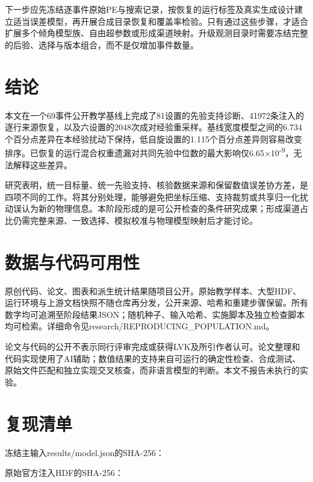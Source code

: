 \documentclass[UTF8,a4paper,11pt,fontset=fandol]{ctexart}
\begin{document}
下一步应先冻结逐事件原始PE与搜索记录，按恢复的运行标签及真实生成设计建立适当误差模型，再开展合成目录恢复和覆盖率检验。只有通过这些步骤，才适合扩展多个倾角模型族、自由超参数或形成渠道映射。升级观测目录时需要冻结完整的后验、选择与版本组合，而不是仅增加事件数量。

\FloatBarrier
\section{结论}\label{sec:10}
本文在一个69事件公开教学基线上完成了81设置的先验支持诊断、41972条注入的逐行来源恢复，以及六设置的2048次成对经验重采样。基线宽度模型之间的6.734个百分点差异在本经验扰动下保持，低自旋设置的1.115个百分点差异则容易改变排序。已恢复的运行混合权重遗漏对共同先验中位数的最大影响仅6.65\(\times\)10\textsuperscript{-9}，无法解释这些差异。

研究表明，统一目标量、统一先验支持、核验数据来源和保留数值误差协方差，是四项不同的工作。将其分别处理，能够避免把坐标压缩、支持裁剪或共享归一化扰动误认为新的物理信息。本阶段形成的是可公开检查的条件研究成果；形成渠道占比仍需完整来源、一致选择、模拟校准与物理模型映射后才能讨论。

\FloatBarrier
\section*{数据与代码可用性}
原创代码、论文、图表和派生统计结果随项目公开。原始教学样本、大型HDF、运行环境与上游文档快照不随仓库再分发，公开来源、哈希和重建步骤保留。所有数字均可追溯至阶段结果JSON；随机种子、输入哈希、实施脚本及独立检查脚本均可检索。详细命令见research/REPRODUCING\_POPULATION.md。

论文与代码的公开不表示同行评审完成或获得LVK及所引作者认可。论文整理和代码实现使用了AI辅助；数值结果的支持来自可运行的确定性检查、合成测试、原始文件匹配和独立实现交叉核查，而非语言模型的判断。本文不报告未执行的实验。

\FloatBarrier
\appendix
\section{复现清单}\label{app:reproduction}
冻结主输入results/model.json的SHA-256：\par\nopagebreak
{}

原始官方注入HDF的SHA-256：\par\nopagebreak
{}
\end{document}
